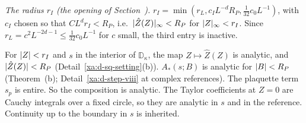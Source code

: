 \begin{detail}\label{xa:d-int}
\emph{The radius $r_I$ (the opening of Section~).} $r_I=\min(r_L,c_IL^{-d}R_P,\frac1{32}c_0L^{-1})$, with $c_I$ chosen so that $CL^dr_I<R_P$, i.e.\ $\lvert\hat Z(Z)\rvert_\infty<R_P$ for $\lvert Z\rvert_\infty<r_I$. Since $r_L=c^2L^{-2d-1}\le\frac1{32}c_0L^{-1}$ for $c$ small, the third entry is inactive.

\begin{step}[(a)]
For $\lvert Z\rvert<r_I$ and $s$ in the interior of $\mathbb D_\kappa$, the map $Z\mapsto\hat Z(Z)$ is analytic, and $\lvert\hat Z(Z)\rvert<R_P$ (Detail~\ref{xa:d-sq-setting}(b)). $A_*(s;B)$ is analytic for $\lvert B\rvert<R_P$ (Theorem~(b); Detail~\ref{xa:d-step-viii} at complex references). The plaquette term $s_p$ is entire. So the composition is analytic. The Taylor coefficients at $Z=0$ are Cauchy integrals over a fixed circle, so they are analytic in $s$ and in the reference. Continuity up to the boundary in $s$ is inherited.
\end{step}


\end{detail}
